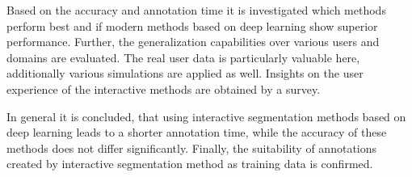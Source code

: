 Based on the accuracy and annotation time it is investigated which methods perform best and if modern methods based on deep learning show superior performance.
Further, the generalization capabilities over various users and domains are evaluated.
The real user data is particularly valuable here, additionally various simulations are applied as well.
Insights on the user experience of the interactive methods are obtained by a survey.

In general it is concluded, that using interactive segmentation methods based on deep learning leads to a shorter annotation time, while the accuracy of these methods does not differ significantly.
Finally, the suitability of annotations created by interactive segmentation method as training data is confirmed.